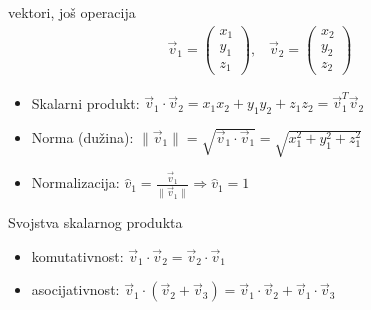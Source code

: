 \documentclass[9pt]{beamer}
\begin{document}
\begin{frame}{vektori, još operacija}
	\begin{align*}
	\vec{v}_1 = \begin{pmatrix}
	x_1 \\ y_1 \\ z_1
	\end{pmatrix}
	, \;\;\;
	\vec{v}_2 = \begin{pmatrix}
	x_2 \\ y_2 \\ z_2
	\end{pmatrix}
	\end{align*}
	\begin{itemize}
		\item Skalarni produkt: $\vec{v}_1 \cdot \vec{v}_2 = x_1x_2 + y_1y_2+z_1z_2 = \vec{v}_1^T \vec{v}_2$
		\item Norma (dužina): $\lVert\vec{v}_1 \rVert = \sqrt{\vec{v}_1 \cdot \vec{v}_1} = \sqrt{x_1^2 + y_1^2+z_1^2}$
		\item Normalizacija: $\hat{v}_1 = \frac{\vec{v}_1}{\lVert\vec{v}_1 \rVert} \Rightarrow\hat{v}_1 = 1 $
	\end{itemize}

	\begin{block}{Svojstva skalarnog produkta}
		\begin{itemize}
			\item komutativnost: $\vec{v}_1 \cdot \vec{v}_2 = \vec{v}_2 \cdot \vec{v}_1$
			\item asocijativnost: $\vec{v}_1 \cdot (\vec{v}_2 + \vec{v}_3) = \vec{v}_1 \cdot \vec{v}_2 + \vec{v}_1 \cdot \vec{v}_3$
		\end{itemize}
	\end{block}

\end{frame}
\end{document}
